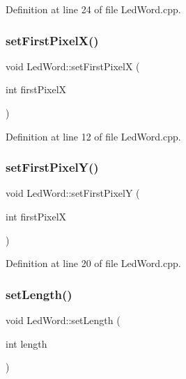 Definition at line 24 of file Led\+Word.\+cpp.

\mbox{\label{class_led_word_aa90a6ff178e09029cf8ab8b206d3872c}} 
\subsubsection{\texorpdfstring{setFirstPixelX()}{setFirstPixelX()}}
{\footnotesize\ttfamily void Led\+Word\+::set\+First\+PixelX (\begin{DoxyParamCaption}\item[{int}]{first\+PixelX }\end{DoxyParamCaption})}



Definition at line 12 of file Led\+Word.\+cpp.

\mbox{\label{class_led_word_a240f0b27e0ad573ae91bbd036213ad25}} 
\subsubsection{\texorpdfstring{setFirstPixelY()}{setFirstPixelY()}}
{\footnotesize\ttfamily void Led\+Word\+::set\+First\+PixelY (\begin{DoxyParamCaption}\item[{int}]{first\+PixelX }\end{DoxyParamCaption})}



Definition at line 20 of file Led\+Word.\+cpp.

\mbox{\label{class_led_word_a5f7dbc94bd68492b0e4f2340d3d0421f}} 
\subsubsection{\texorpdfstring{setLength()}{setLength()}}
{\footnotesize\ttfamily void Led\+Word\+::set\+Length (\begin{DoxyParamCaption}\item[{int}]{length }\end{DoxyParamCaption})}



